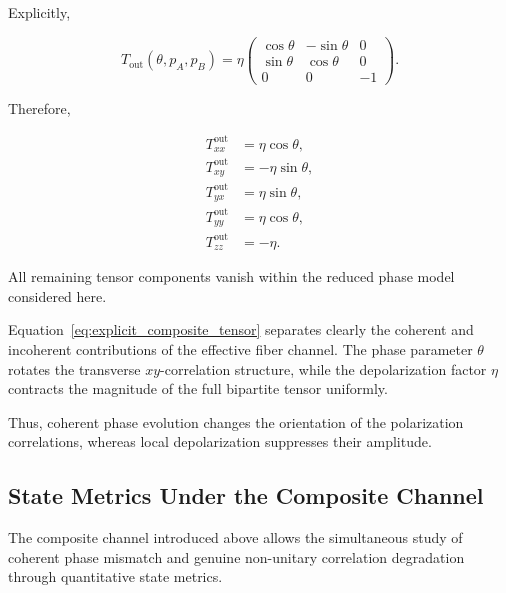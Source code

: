 Explicitly,

\begin{equation}
T_{\mathrm{out}}(\theta,p_A,p_B)
=
\eta
\begin{pmatrix}
\cos\theta & -\sin\theta & 0 \\
\sin\theta & \cos\theta & 0 \\
0 & 0 & -1
\end{pmatrix}.
\label{eq:explicit_composite_tensor}
\end{equation}

Therefore,

\begin{align}
T_{xx}^{\mathrm{out}} &= \eta\cos\theta, \\
T_{xy}^{\mathrm{out}} &= -\eta\sin\theta, \\
T_{yx}^{\mathrm{out}} &= \eta\sin\theta, \\
T_{yy}^{\mathrm{out}} &= \eta\cos\theta, \\
T_{zz}^{\mathrm{out}} &= -\eta.
\end{align}

All remaining tensor components vanish within the reduced phase model considered here.

\medskip

Equation~\eqref{eq:explicit_composite_tensor} separates clearly the coherent and incoherent contributions of the effective fiber channel. The phase parameter \( \theta \) rotates the transverse \( xy \)-correlation structure, while the depolarization factor \( \eta \) contracts the magnitude of the full bipartite tensor uniformly.

\medskip

Thus, coherent phase evolution changes the orientation of the polarization correlations, whereas local depolarization suppresses their amplitude.

\medskip


\subsection{State Metrics Under the Composite Channel}

The composite channel introduced above allows the simultaneous study of coherent phase mismatch and genuine non-unitary correlation degradation through quantitative state metrics.

